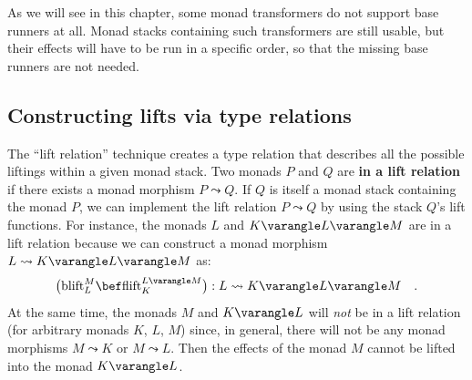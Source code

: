 As we will see in this chapter, some monad transformers do not support
base runners at all. Monad stacks containing such transformers are
still usable, but their effects will have to be run in a specific
order, so that the missing base runners are not needed.

\subsection{Constructing lifts via type relations\label{subsec:Constructing-lifts-via-type-relations}}

The \textsf{``}lift
relation\textsf{''} technique creates a type relation
that describes all the possible liftings within a given monad stack.
Two monads $P$ and $Q$ are \textbf{in a lift relation} if there
exists a monad morphism $P\leadsto Q$. If $Q$ is itself a monad
stack containing the monad $P$, we can implement the lift relation
$P\leadsto Q$ by using the stack $Q$\textsf{'}s lift functions. For instance,
the monads $L$ and $K\varangle L\varangle M$ are in a lift relation
because we can construct a monad morphism $L\leadsto K\varangle L\varangle M$
as:
\[
\big(\text{blift}_{L}^{M}\bef\text{flift}_{K}^{L\varangle M}\big):L\leadsto K\varangle L\varangle M\quad.
\]
At the same time, the monads $M$ and $K\varangle L$ will \emph{not}
be in a lift relation (for arbitrary monads $K$, $L$, $M$) since,
in general, there will not be any monad morphisms $M\leadsto K$ or
$M\leadsto L$. Then the effects of the monad $M$ cannot be lifted
into the monad $K\varangle L$.

